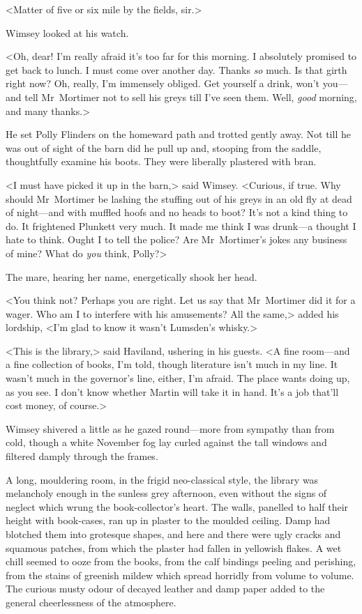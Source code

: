 <Matter of five or six mile by the fields, sir.>

Wimsey looked at his watch.

<Oh, dear! I'm really afraid it's too far for this morning. I absolutely promised to get back to lunch. I must come over another day. Thanks \textit{so} much. Is that girth right now? Oh, really, I'm immensely obliged. Get yourself a drink, won't you—and tell Mr~Mortimer not to sell his greys till I've seen them. Well, \textit{good} morning, and many thanks.>

He set Polly Flinders on the homeward path and trotted gently away. Not till he was out of sight of the barn did he pull up and, stooping from the saddle, thoughtfully examine his boots. They were liberally plastered with bran.

<I must have picked it up in the barn,> said Wimsey. <Curious, if true. Why should Mr~Mortimer be lashing the stuffing out of his greys in an old fly at dead of night—and with muffled hoofs and no heads to boot? It's not a kind thing to do. It frightened Plunkett very much. It made me think I was drunk—a thought I hate to think. Ought I to tell the police? Are Mr~Mortimer's jokes any business of mine? What do \textit{you} think, Polly?>

The mare, hearing her name, energetically shook her head.

<You think not? Perhaps you are right. Let us say that Mr~Mortimer did it for a wager. Who am I to interfere with his amusements? All the same,> added his lordship, <I'm glad to know it wasn't Lumsden's whisky.>

\divider
<This is the library,> said Haviland, ushering in his guests. <A fine room—and a fine collection of books, I'm told, though literature isn't much in my line. It wasn't much in the governor's line, either, I'm afraid. The place wants doing up, as you see. I don't know whether Martin will take it in hand. It's a job that'll cost money, of course.>

Wimsey shivered a little as he gazed round—more from sympathy than from cold, though a white November fog lay curled against the tall windows and filtered damply through the frames.

A long, mouldering room, in the frigid neo-classical style, the library was melancholy enough in the sunless grey afternoon, even without the signs of neglect which wrung the book-collector's heart. The walls, panelled to half their height with book-cases, ran up in plaster to the moulded ceiling. Damp had blotched them into grotesque shapes, and here and there were ugly cracks and squamous patches, from which the plaster had fallen in yellowish flakes. A wet chill seemed to ooze from the books, from the calf bindings peeling and perishing, from the stains of greenish mildew which spread horridly from volume to volume. The curious musty odour of decayed leather and damp paper added to the general cheerlessness of the atmosphere.

